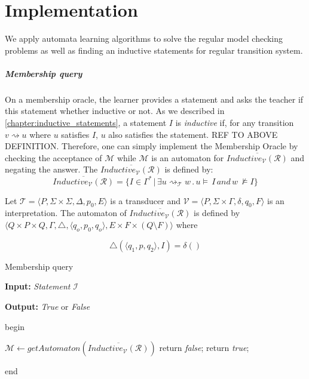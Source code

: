 \chapter{Implementation}\label{chapter:implementation}

We apply automata learning algorithms to solve the regular model checking problems
as well as finding an inductive statements for regular transition system.

\paragraph*{Membership query}
On a membership oracle, the learner provides a statement and asks the teacher if 
this statement whether inductive or not. As we described in \autoref{chapter:inductive_statements}, 
a statement $I$ is \textit{inductive} if, for any transition $v \rightsquigarrow u$
where $u$ satisfies $I$, $u$ also satisfies the statement.
REF TO ABOVE DEFINITION.
Therefore, one can simply implement the Membership Oracle by checking the acceptance 
of $\mathcal{M}$ while $\mathcal{M}$ is an automaton for 
$\overline{Inductive_{\mathcal{V}}(\mathcal{R})}$ and negating the answer.
The $\overline{Inductive_{\mathcal{V}}(\mathcal{R})}$ is defined by:
\[ \overline{Inductive_{\mathcal{V}}(\mathcal{R})} = \lbrace I \in \Gamma^* \, | \, \exists u
\rightsquigarrow_\mathcal{T} w \, . \, u \models \, I \, and \, w \, \not\models I\rbrace
\]

Let $\mathcal{T} =  \langle P, \Sigma \times \Sigma, \Delta, p_0, E \rangle$ 
is a transducer and  $\mathcal{V} =  \langle P, \Sigma \times \Gamma, \delta, q_0, F \rangle$ is 
an interpretation. The automaton of $\overline{Inductive_{\mathcal{V}}(\mathcal{R})}$ 
is defined by $\langle Q \times P \times Q, \Gamma, \triangle, \langle q_o,  p_0, q_o \rangle, 
E \times F \times (Q \setminus F) \rangle$ where

\[
    \triangle(\langle q_1, p, q_2 \rangle, I) = \delta()
\]


\begin{algorithm}
\caption{Membership query}\label{alg:membership}
\textbf{Input: } \textit{Statement} $\mathcal{I}$ 

\textbf{Output: } \textit{True} or \textit{False}

begin
\begin{algorithmic}
    \State $\mathcal{M} \gets getAutomaton(\overline{Inductive_{\mathcal{V}}(\mathcal{R})})$
        \State return \textit{false};
    \Else
        \State return \textit{true};
    \EndIf
\end{algorithmic}
end
\end{algorithm}

